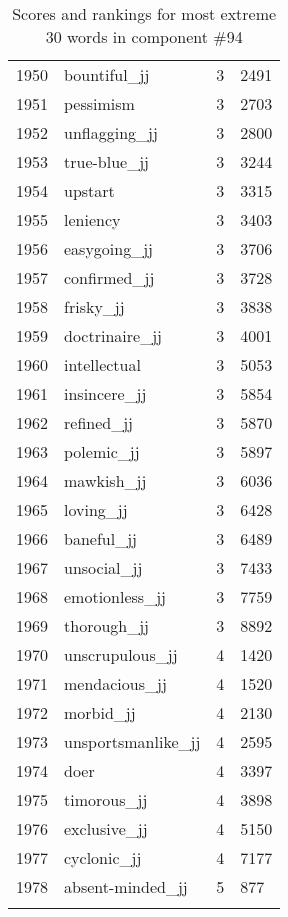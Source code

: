 \begin{longtable}[!htbp]{| rlr@{.}l |}
    1950 & bountiful\_jj & 3 & 2491 \\
    1951 & pessimism & 3 & 2703 \\
    1952 & unflagging\_jj & 3 & 2800 \\
    1953 & true-blue\_jj & 3 & 3244 \\
    1954 & upstart & 3 & 3315 \\
    1955 & leniency & 3 & 3403 \\
    1956 & easygoing\_jj & 3 & 3706 \\
    1957 & confirmed\_jj & 3 & 3728 \\
    1958 & frisky\_jj & 3 & 3838 \\
    1959 & doctrinaire\_jj & 3 & 4001 \\
    1960 & intellectual & 3 & 5053 \\
    1961 & insincere\_jj & 3 & 5854 \\
    1962 & refined\_jj & 3 & 5870 \\
    1963 & polemic\_jj & 3 & 5897 \\
    1964 & mawkish\_jj & 3 & 6036 \\
    1965 & loving\_jj & 3 & 6428 \\
    1966 & baneful\_jj & 3 & 6489 \\
    1967 & unsocial\_jj & 3 & 7433 \\
    1968 & emotionless\_jj & 3 & 7759 \\
    1969 & thorough\_jj & 3 & 8892 \\
    1970 & unscrupulous\_jj & 4 & 1420 \\
    1971 & mendacious\_jj & 4 & 1520 \\
    1972 & morbid\_jj & 4 & 2130 \\
    1973 & unsportsmanlike\_jj & 4 & 2595 \\
    1974 & doer & 4 & 3397 \\
    1975 & timorous\_jj & 4 & 3898 \\
    1976 & exclusive\_jj & 4 & 5150 \\
    1977 & cyclonic\_jj & 4 & 7177 \\
    1978 & absent-minded\_jj & 5 & 877 \\
    \hline
    \caption{Scores and rankings for most extreme 30 words in component \#94} \\
\end{longtable}
